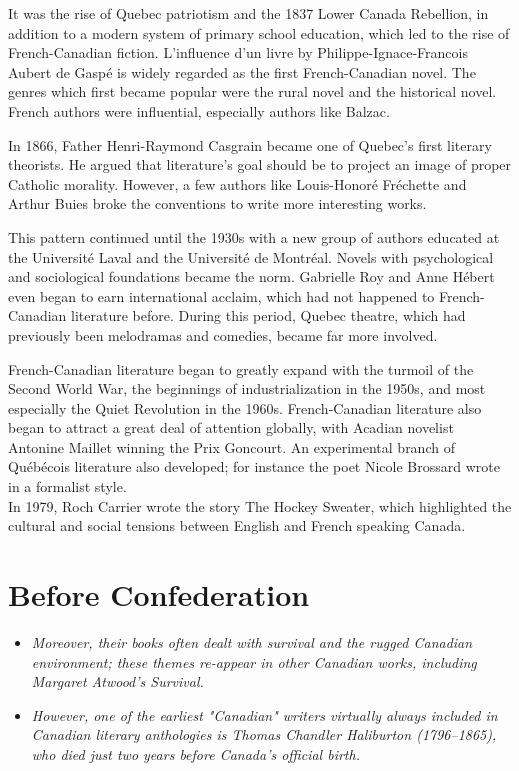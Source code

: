It was the rise of Quebec patriotism and the 1837 Lower Canada
Rebellion, in addition to a modern system of primary school education,
which led to the rise of French-Canadian fiction. L'influence d'un livre
by Philippe-Ignace-Francois Aubert de Gaspé is widely regarded as the
first French-Canadian novel. The genres which first became popular were
the rural novel and the historical novel. French authors were
influential, especially authors like Balzac.

In 1866, Father Henri-Raymond Casgrain became one of Quebec's first
literary theorists. He argued that literature's goal should be to
project an image of proper Catholic morality. However, a few authors
like Louis-Honoré Fréchette and Arthur Buies broke the conventions to
write more interesting works.

This pattern continued until the 1930s with a new group of authors
educated at the Université Laval and the Université de Montréal. Novels
with psychological and sociological foundations became the norm.
Gabrielle Roy and Anne Hébert even began to earn international acclaim,
which had not happened to French-Canadian literature before. During this
period, Quebec theatre, which had previously been melodramas and
comedies, became far more involved.

French-Canadian literature began to greatly expand with the turmoil of
the Second World War, the beginnings of industrialization in the 1950s,
and most especially the Quiet Revolution in the 1960s. French-Canadian
literature also began to attract a great deal of attention globally,
with Acadian novelist Antonine Maillet winning the Prix Goncourt. An
experimental branch of Québécois literature also developed; for instance
the poet Nicole Brossard wrote in a formalist style.\\
In 1979, Roch Carrier wrote the story The Hockey Sweater, which
highlighted the cultural and social tensions between English and French
speaking Canada.

\section{Before Confederation}\label{before-confederation}

\begin{itemize}
\item
  \emph{Moreover, their books often dealt with survival and the rugged
  Canadian environment; these themes re-appear in other Canadian works,
  including Margaret Atwood's Survival.}
\item
  \emph{However, one of the earliest "Canadian" writers virtually always
  included in Canadian literary anthologies is Thomas Chandler
  Haliburton (1796--1865), who died just two years before Canada's
  official birth.}
\end{itemize}

